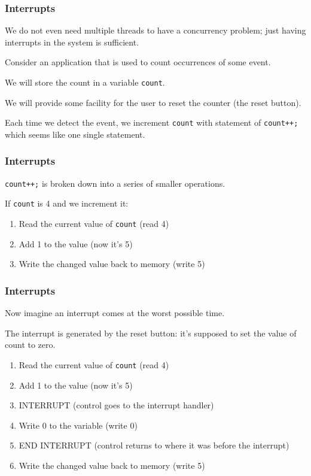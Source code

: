\begin{frame}
\frametitle{Interrupts}

We do not even need multiple threads to have a concurrency problem; just having interrupts in the system is sufficient.

Consider an application that is used to count occurrences of some event. 

We will store the count in a variable \texttt{count}.

We will provide some facility for the user to reset the counter (the reset button). 

Each time we detect the event, we increment \texttt{count} with statement of \texttt{count++;} which seems like one single statement.



\end{frame}

\begin{frame}
\frametitle{Interrupts}

\texttt{count++;} is broken down into a series of smaller operations.

If \texttt{count} is 4 and we increment it:

\begin{enumerate}
	\item Read the current value of \texttt{count} (read 4)
	\item Add 1 to the value (now it's 5)
	\item Write the changed value back to memory (write 5)
\end{enumerate}


\end{frame}

\begin{frame}
\frametitle{Interrupts}

Now imagine an interrupt comes at the worst possible time. 

The interrupt is generated by the reset button: it's supposed to set the value of count to zero.

\begin{enumerate}
	\item Read the current value of \texttt{count} (read 4)
	\item Add 1 to the value (now it's 5)
	\item INTERRUPT (control goes to the interrupt handler)
	\item Write 0 to the variable (write 0)
	\item END INTERRUPT (control returns to where it was before the interrupt)
	\item Write the changed value back to memory (write 5)
\end{enumerate}

\end{frame}

